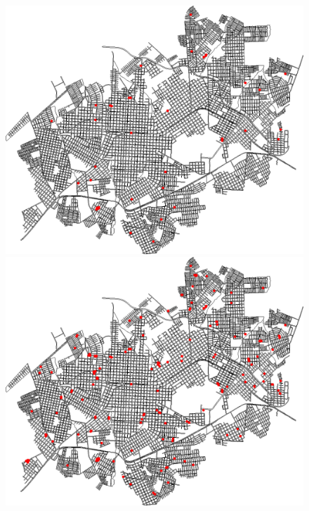 \begin{figure}[H]
\begin{minipage}{.5\textwidth}
    \captionsetup{labelformat=empty}
  \end{minipage}
  \begin{minipage}{.5\textwidth}
    \centering
    \includegraphics[width=1.0\textwidth]{Figuras/Resultados/0002/Saidas/MonteCarlo_0/Simulacao_0/Acumulado/00008.png}
    \captionsetup{labelformat=empty}
  \end{minipage}%
  \centering
  \begin{minipage}{.5\textwidth}
    \centering
    \includegraphics[width=1.0\textwidth]{Figuras/Resultados/0002/Saidas/MonteCarlo_0/Simulacao_0/Acumulado/00012.png}

\end{minipage}
\end{figure}
